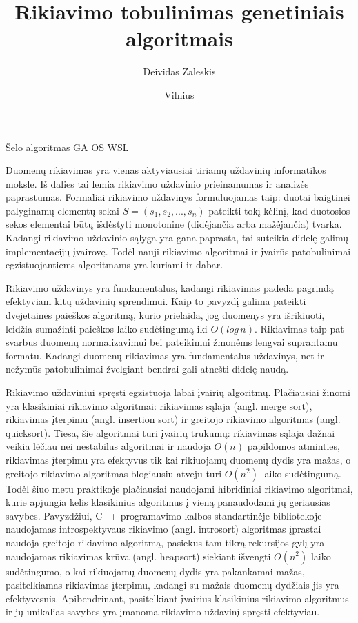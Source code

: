 \documentclass{VUMIFInfBakalaurinis}
\institute{Informatikos institutas}
\title{Rikiavimo tobulinimas genetiniais algoritmais}
\author{Deividas Zaleskis}
\date{Vilnius \\ \the\year}
\begin{document}
\maketitle

\tableofcontents


Šelo algoritmas
GA
OS
WSL


Duomenų rikiavimas yra vienas aktyviausiai tiriamų uždavinių informatikos moksle.
Iš dalies tai lemia rikiavimo uždavinio prieinamumas ir analizės paprastumas.
Formaliai rikiavimo uždavinys formuluojamas taip:
duotai baigtinei palyginamų elementų sekai $S = (s_1, s_2, ..., s_n)$ pateikti tokį
kėlinį, kad duotosios sekos elementai būtų išdėstyti monotonine (didėjančia arba mažėjančia) tvarka.
Kadangi rikiavimo uždavinio sąlyga yra gana paprasta, tai suteikia didelę galimų implementacijų įvairovę.
Todėl nauji rikiavimo algoritmai ir įvairūs patobulinimai egzistuojantiems algoritmams yra kuriami ir dabar.

Rikiavimo uždavinys yra fundamentalus, kadangi rikiavimas padeda pagrindą efektyviam kitų uždavinių sprendimui.
Kaip to pavyzdį galima pateikti dvejetainės paieškos algoritmą, kurio prielaida,
jog duomenys yra išrikiuoti, leidžia sumažinti paieškos laiko sudėtingumą iki $O(log\,n)$.
Rikiavimas taip pat svarbus duomenų normalizavimui bei pateikimui žmonėms lengvai suprantamu formatu.
Kadangi duomenų rikiavimas yra fundamentalus uždavinys, net ir nežymūs patobulinimai žvelgiant bendrai
gali atnešti didelę naudą.

Rikiavimo uždaviniui spręsti egzistuoja labai įvairių algoritmų.
Plačiausiai žinomi yra klasikiniai rikiavimo algoritmai: rikiavimas sąlaja (angl. merge sort), rikiavimas įterpimu (angl. insertion sort) ir greitojo rikiavimo algoritmas (angl. quicksort).
Tiesa, šie algoritmai turi įvairių trukūmų:
rikiavimas sąlaja dažnai veikia lėčiau nei nestabilūs algoritmai ir naudoja $O(n)$ papildomos atminties, rikiavimas įterpimu yra efektyvus tik kai rikiuojamų duomenų dydis yra mažas, o
greitojo rikiavimo algoritmas blogiausiu atveju turi $O(n^2)$ laiko sudėtingumą.
Todėl šiuo metu praktikoje plačiausiai naudojami hibridiniai rikiavimo algoritmai, kurie apjungia kelis klasikinius algoritmus į vieną panaudodami jų geriausias savybes.
Pavyzdžiui, C++ programavimo kalbos standartinėje bibliotekoje naudojamas introspektyvaus rikiavimo (angl. introsort) algoritmas įprastai naudoja greitojo rikiavimo algoritmą,
pasiekus tam tikrą rekursijos gylį yra naudojamas rikiavimas krūva (angl. heapsort) siekiant išvengti $O(n^2)$ laiko sudėtingumo,
o kai rikiuojamų duomenų dydis yra pakankamai mažas, pasitelkiamas rikiavimas įterpimu, kadangi su mažais duomenų dydžiais jis yra efektyvesnis.
Apibendrinant, pasitelkiant įvairius klasikinius rikiavimo algoritmus ir jų unikalias savybes yra įmanoma rikiavimo uždavinį spręsti efektyviau.
\end{document}
